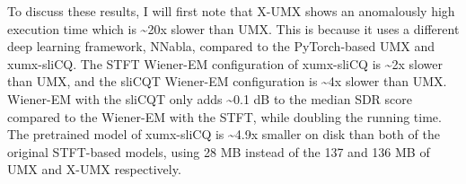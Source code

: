 \documentclass[report.tex]{subfiles}
\begin{document}
To discuss these results, I will first note that X-UMX shows an anomalously high execution time which is \textasciitilde20x slower than UMX. This is because it uses a different deep learning framework, NNabla, compared to the PyTorch-based UMX and xumx-sliCQ. The STFT Wiener-EM configuration of xumx-sliCQ is \textasciitilde2x slower than UMX, and the sliCQT Wiener-EM configuration is \textasciitilde4x slower than UMX. Wiener-EM with the sliCQT only adds \textasciitilde0.1 dB to the median SDR score compared to the Wiener-EM with the STFT, while doubling the running time. The pretrained model of xumx-sliCQ is \textasciitilde4.9x smaller on disk than both of the original STFT-based models, using 28 MB instead of the 137 and 136 MB of UMX and X-UMX respectively.
\end{document}
